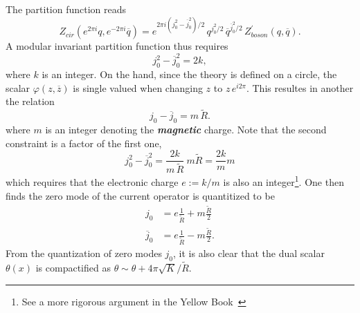 The partition function reads
\begin{equation}
	Z_{cir}(e^{2\pi i}q,e^{-2\pi i}\overline{q}) = e^{2\pi i \left(j_0^2 - \overline{j}_0^2\right)/2} \, q^{j_0^2/2} \, \overline{q}^{\overline{j}_0^2/2} \, Z^{\prime}_{boson} (q,\overline{q}).
\end{equation}
A modular invariant partition function thus requires 
\begin{equation}
	j_0^2 - \overline{j}_0^2 = 2k,
\end{equation}
where $k$ is an integer. On the hand, since the theory is defined on a circle, the scalar $\varphi(z,\overline{z})$ is single valued when changing $z$ to $z\,e^{i2\pi}$. This resultes in another the relation
\begin{equation}
	j_0 - \overline{j}_0 = m\,\tilde{R}.
\end{equation}
where $m$ is an integer denoting the \textbf{\textit{magnetic}} charge. Note that the second constraint is a factor of the first one, 
\begin{equation}
	j_0^2 - \overline{j}_0^2 = \frac{2k}{m\,\tilde{R}} \ m \tilde{R} = \frac{2k}{m} m
\end{equation}
which requires that the electronic charge $e := k/m$ is also an integer\footnote{See a more rigorous argument in the Yellow Book~\cite{francesco2012conformal}}. One then finds the zero mode of the current operator is quantitized to be 
\begin{equation}
	\begin{aligned}
		j_0 &= e \frac{1}{\tilde{R}} + m \frac{\tilde{R}}{2} \\
		\overline{j}_0 &= e \frac{1}{\tilde{R}} - m \frac{\tilde{R}}{2}.
	\end{aligned}
\end{equation}
From the quantization of zero modes $j_0$, it is also clear that the dual scalar $\theta(x)$ is compactified as $\theta \sim \theta + 4\pi\sqrt{K}/\tilde{R}$. 

